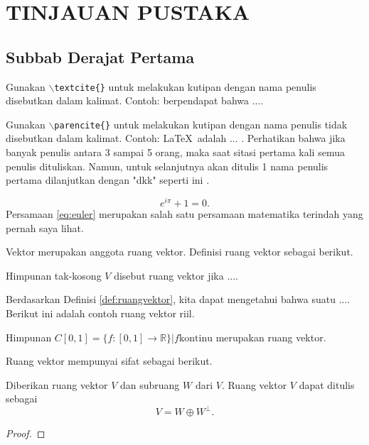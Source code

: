 \chapter{TINJAUAN PUSTAKA}

\section{Subbab Derajat Pertama}
Gunakan \texttt{$\backslash$textcite\{\}} untuk melakukan kutipan dengan nama penulis disebutkan dalam kalimat. Contoh: \textcite{knuth:1984} berpendapat bahwa .... 

Gunakan \texttt{$\backslash$parencite\{\}} untuk melakukan kutipan dengan nama penulis tidak disebutkan dalam kalimat. Contoh: \LaTeX \, adalah ... \parencite{latex:companion}. Perhatikan bahwa jika banyak penulis antara 3 sampai 5 orang, maka saat sitasi pertama kali semua penulis dituliskan. Namun, untuk selanjutnya akan ditulis 1 nama penulis pertama
dilanjutkan dengan "dkk" seperti ini \parencite{latex:companion}.

\begin{equation}
    e^{i\pi}+1=0.
    \label{eq:euler}
\end{equation}
Persamaan \eqref{eq:euler} merupakan salah satu persamaan matematika terindah yang pernah saya lihat.

Vektor merupakan anggota ruang vektor. Definisi ruang vektor sebagai berikut.
\begin{definition}
    Himpunan tak-kosong $V$ disebut ruang vektor jika ....
    \label{def:ruangvektor}
\end{definition}
Berdasarkan Definisi \ref{def:ruangvektor}, kita dapat mengetahui bahwa suatu ....
Berikut ini adalah contoh ruang vektor riil.
\begin{example}
    Himpunan $C[0,1] = \{f:[0,1] \to \mathbb{R}\} | f \mbox{kontinu}$ merupakan ruang vektor.
\end{example}

Ruang vektor mempunyai sifat sebagai berikut.
\begin{theorem}
    Diberikan ruang vektor $V$ dan subruang $W$ dari $V$. Ruang vektor $V$ dapat ditulis sebagai
	\begin{equation}
		V = W \oplus W^{\perp}. \label{eq:dekomposisiruangvektor}
	\end{equation}
    \label{thm:gramschmidt}
\end{theorem}

\begin{proof}
    \lipsum[1]
\end{proof}

